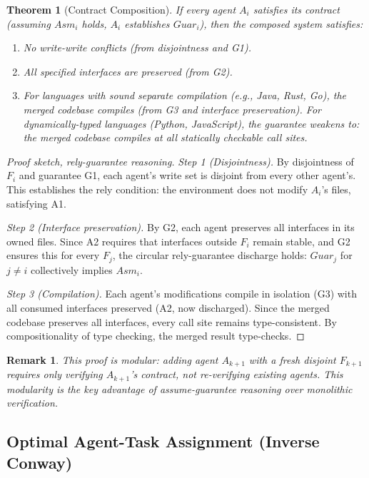 \documentclass[11pt, a4paper]{googledeepmind}
\newtheorem{theorem}{Theorem}[section]
\newtheorem*{remark}{Remark}
\begin{document}
\begin{theorem}[Contract Composition]
\label{thm:composition}
If every agent $A_i$ satisfies its contract (assuming $Asm_i$ holds, $A_i$ establishes $Guar_i$), then the composed system satisfies:
\begin{enumerate}[nosep]
    \item No write-write conflicts (from disjointness and G1).
    \item All specified interfaces are preserved (from G2).
    \item For languages with sound separate compilation (e.g., Java, Rust, Go), the merged codebase compiles (from G3 and interface preservation). For dynamically-typed languages (Python, JavaScript), the guarantee weakens to: the merged codebase compiles at all statically checkable call sites.
\end{enumerate}
\end{theorem}

\begin{proof}[Proof sketch, rely-guarantee reasoning]
\textit{Step 1 (Disjointness).}
By disjointness of $F_i$ and guarantee G1, each agent's write set is disjoint from every other agent's. This establishes the rely condition: the environment does not modify $A_i$'s files, satisfying A1.

\textit{Step 2 (Interface preservation).}
By G2, each agent preserves all interfaces in its owned files. Since A2 requires that interfaces outside $F_i$ remain stable, and G2 ensures this for every $F_j$, the circular rely-guarantee discharge holds: $Guar_j$ for $j \neq i$ collectively implies $Asm_i$.

\textit{Step 3 (Compilation).}
Each agent's modifications compile in isolation (G3) with all consumed interfaces preserved (A2, now discharged). Since the merged codebase preserves all interfaces, every call site remains type-consistent. By compositionality of type checking, the merged result type-checks.
\end{proof}

\begin{remark}
This proof is modular: adding agent $A_{k+1}$ with a fresh disjoint $F_{k+1}$ requires only verifying $A_{k+1}$'s contract, not re-verifying existing agents. This modularity is the key advantage of assume-guarantee reasoning over monolithic verification.
\end{remark}

\subsection{Optimal Agent-Task Assignment (Inverse Conway)}
\end{document}
